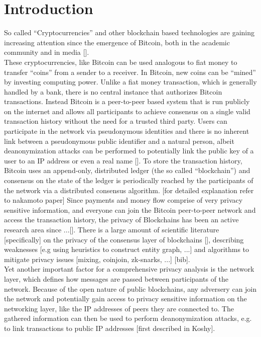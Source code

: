 \section{Introduction}
So called ``Cryptocurrencies'' and other blockchain based technologies are gaining
increasing attention since the emergence of Bitcoin, both in the academic community and in media []. \\
These cryptocurrencies, like Bitcoin can be used analogous to fiat money to transfer ``coins''
from a sender to a receiver. In Bitcoin, new coins can be ``mined'' by investing computing power.
Unlike a fiat money transaction, which is generally handled by a bank, there is no central instance
that authorizes Bitcoin transactions. Instead Bitcoin is a peer-to-peer based system that is run publicly on the internet
and allows all participants to achieve consensus on a single valid transaction history without the need for a trusted third party.
Users can participate in the network via pseudonymous identities and there is no inherent link between a pseudonymous public identifier and a natural person,
albeit deanonymization attacks can be performed to potentially link the public key of a user to an IP address or even a real name [].
To store the transaction history, Bitcoin uses an append-only, distributed ledger (the so called ``blockchain'')
and consensus on the state of the ledger is periodically reached
by the participants of the network via a distributed consensus algorithm. [for detailed explanation refer to nakamoto paper]
Since payments and money flow comprise of very privacy sensitive information, and everyone can join the Bitcoin peer-to-peer network
and access the transaction history, the privacy of Blockchains has been an active research area since ...[].
There is a large amount of scientific literature [specifically] on the privacy of the consensus layer of
blockchains [], describing weaknesses [e.g using heuristics to construct entity graph, ...] and algorithms to mitigate privacy issues [mixing, coinjoin, zk-snarks, ...] [bib]. \\
Yet another important factor for a comprehensive privacy analysis is the network layer, which
defines how messages are passed between participants of the network.
Because of the open nature of public blockchains, any adversery can join the network and potentially gain access to
privacy sensitive information on the networking layer, like the IP addresses of peers they are connected to.
The gathered information can then be used to perform deanonymization attacks, e.g. to link transactions to public IP addresses [first described in Koshy]. \\
